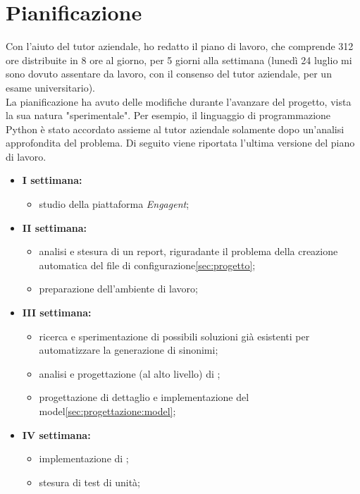 \section{Pianificazione}
Con l'aiuto del tutor aziendale, ho redatto il piano di lavoro, che comprende 312 ore distribuite in 8 ore al giorno, per 5 giorni alla settimana (lunedì 24 luglio mi sono dovuto assentare da lavoro, con il consenso del tutor aziendale, per un esame universitario).\\
La pianificazione ha avuto delle modifiche durante l'avanzare del progetto, vista la sua natura "sperimentale". Per esempio, il linguaggio di programmazione Python è stato accordato assieme al tutor aziendale solamente dopo un'analisi approfondita del problema.
Di seguito viene riportata l'ultima versione del piano di lavoro.
\begin{itemize}
    \item \textbf{I settimana:}
    \begin{itemize}
        \item studio della piattaforma \emph{Engagent};
    \end{itemize}
    \item \textbf{II settimana:}
    \begin{itemize}
        \item analisi e stesura di un report, riguradante il problema della creazione automatica del file di configurazione\ref{sec:progetto};
        \item preparazione dell'ambiente di lavoro;
    \end{itemize}
    \item \textbf{III settimana:}
        \begin{itemize}
            \item ricerca e sperimentazione di possibili soluzioni già esistenti per automatizzare la generazione di sinonimi;
            \item analisi e progettazione (al alto livello) di \app{};
            \item progettazione di dettaglio e implementazione del model\ref{sec:progettazione:model};
        \end{itemize}
    \item \textbf{IV settimana:}
    \begin{itemize}
        \item implementazione di \app{};
        \item stesura di test di unità;
    \end{itemize}

\end{itemize}
